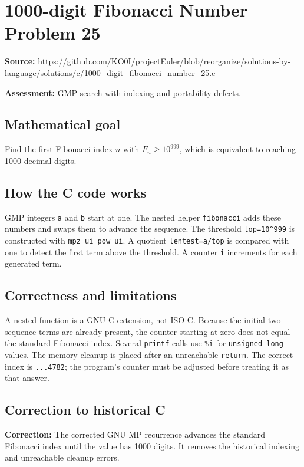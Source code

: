 \section{1000-digit Fibonacci Number --- Problem 25}
\label{prob:25}
\noindent\textbf{Source:} \url{https://github.com/KO0I/projectEuler/blob/reorganize/solutions-by-language/solutions/c/1000_digit_fibonacci_number_25.c}

\noindent\textbf{Assessment:} GMP search with indexing and portability defects.

\subsection*{Mathematical goal}
Find the first Fibonacci index \(n\) with \(F_n\geq10^{999}\), which is equivalent to reaching 1000 decimal digits.

\subsection*{How the C code works}
GMP integers \verb|a| and \verb|b| start at one. The nested helper \verb|fibonacci| adds these numbers and swaps them to advance the sequence. The threshold \verb|top=10^999| is constructed with \verb|mpz_ui_pow_ui|. A quotient \verb|lentest=a/top| is compared with one to detect the first term above the threshold. A counter \verb|i| increments for each generated term.

\subsection*{Correctness and limitations}
A nested function is a GNU C extension, not ISO C. Because the initial two sequence terms are already present, the counter starting at zero does not equal the standard Fibonacci index. Several \verb|printf| calls use \verb|%i| for \verb|unsigned long| values. The memory cleanup is placed after an unreachable \verb|return|. The correct index is \texttt{...4782}; the program's counter must be adjusted before treating it as that answer.


\subsection*{Correction to historical C}
{\color{red}\textbf{Correction:} The corrected GNU MP recurrence advances the standard Fibonacci index until the value has 1000 digits. It removes the historical indexing and unreachable cleanup errors.}
